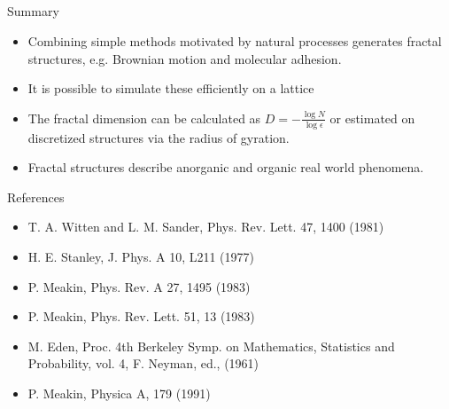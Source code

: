 \documentclass[smaller]{beamer}
\begin{document}
        \subsection*{}
            \begin{frame}{Summary}
                \begin{itemize}
                    \item Combining \alert{simple} methods motivated by \alert{natural processes} generates fractal structures, e.g.
                            \alert{Brownian motion} and \alert{molecular adhesion}.
                    \vspace{.5cm}
                    \item It is possible to simulate these efficiently on a \alert{lattice}
                    \vspace{.5cm}
                    \item The \alert{fractal dimension} can be calculated as $D=-\frac{\log N}{\log \epsilon}$ or estimated on discretized structures via the \alert{radius of gyration}.
                    \vspace{.5cm}
                    \item Fractal structures describe anorganic and organic \alert{real world phenomena}.
                \end{itemize}
            \end{frame}
            \begin{frame}{References}
                \begin{itemize}
                    \item T. A. Witten and L. M. Sander, Phys. Rev. Lett. 47, 1400 (1981)
                    \item H. E. Stanley, J. Phys. A 10, L211 (1977)
                    \item P. Meakin, Phys. Rev. A 27, 1495 (1983)
                    \item P. Meakin, Phys. Rev. Lett. 51, 13 (1983)
                    \item M. Eden, Proc. 4th Berkeley Symp. on Mathematics, Statistics and Probability, vol. 4, F. Neyman, ed., (1961)
                    \item P. Meakin, Physica A, 179 (1991)
                \end{itemize}
            \end{frame}
\end{document}
